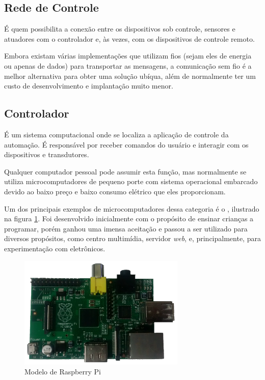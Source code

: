 \subsection{Rede de Controle}
É quem possibilita a conexão entre os dispositivos sob controle, sensores e atuadores com o controlador e, às
vezes, com os dispositivos de controle remoto. \cite{kyas2013}

Embora existam várias implementações que utilizam fios (sejam eles de energia ou apenas de dados) para
transportar as mensagens, a comunicação sem fio é a melhor alternativa para obter uma solução ubíqua, além de
normalmente ter um custo de desenvolvimento e implantação muito menor.

\subsection{Controlador}
É um sistema computacional onde se localiza a aplicação de controle da automação. É responsável por receber comandos do
usuário e interagir com os dispositivos e transdutores.

Qualquer computador pessoal pode assumir esta função, mas normalmente se utiliza microcomputadores de pequeno porte com sistema
operacional embarcado devido ao baixo preço e baixo consumo elétrico que eles proporcionam.

Um dos principais exemplos de microcomputadores dessa categoria é o , ilustrado na figura
\ref{figura:pi}. Foi desenvolvido inicialmente com o propósito de ensinar crianças a programar, porém ganhou uma
imensa aceitação e passou a ser utilizado para diversos propósitos, como centro multimídia, servidor
\textit{web}, e, principalmente, para experimentação com eletrônicos. \cite{schmidt2014}

\begin{figure}[h]
	\centering
	\includegraphics[width=300]{../images/raspberry.png}
	\caption{Modelo de Raspberry Pi}
	\label{figura:pi}
\end{figure}

